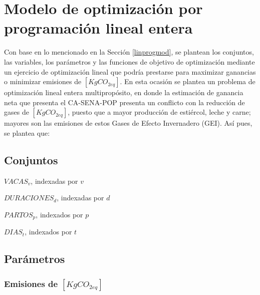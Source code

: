 

\section{Modelo de optimización por programación lineal entera} 

Con base en lo mencionado en la Sección \ref{linprogmod}, se plantean los conjuntos, las variables, los parámetros y las funciones de objetivo de optimización mediante un ejercicio de optimización lineal que podría prestarse para maximizar ganancias o minimizar emisiones de $[KgCO_{2eq}]$. En esta ocasión se plantea un problema de optimización lineal entera multipropósito, en donde la estimación de ganancia neta que presenta el CA-SENA-POP presenta un conflicto con la reducción de gases de $[KgCO_{2eq}]$, puesto que a mayor producción de estiércol, leche y carne; mayores son las emisiones de estos Gases de Efecto Invernadero (GEI). Así pues, se plantea que:

\subsection{Conjuntos}
\begin{itemize}
\begin{multicols}{2}
    \item $VACAS_{v}$, indexadas por $v$
    \item $DURACIONES_{d}$, indexadas por $d$
    \item $PARTOS_{p}$, indexados por $p$
    \item $DIAS_{t}$, indexados por $t$
\end{multicols}
\end{itemize}
\subsection{Parámetros}

\subsubsection{Emisiones de $[KgCO_{2eq}]$}

